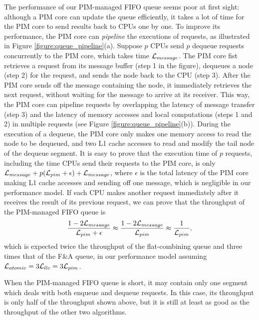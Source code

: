 The performance of our PIM-managed FIFO queue seems poor at first sight: although a PIM core can update 
the queue efficiently, it takes a lot of time for the PIM core to send results back to CPUs one by one. 
To improve its performance, the PIM core can \textit{pipeline} the executions of requests, 
as illustrated in Figure \ref{figure:queue_pipeline}(a). 
Suppose $p$ CPUs send $p$ dequeue requests concurrently to the PIM core, which takes time $\mathcal{L}_{message}$. 
The PIM core fist retrieves a request from its message buffer (step 1 in the figure), 
dequeues a node (step 2) for the request, and sends the node back to the CPU (step 3). 
After the PIM core sends off the message containing the node, it immediately retrieves the next 
request, without waiting for the message to arrive at its receiver. 
This way, the PIM core can pipeline requests by overlapping the latency of message transfer (step 3) 
and the latency of memory accesses and local computations (steps 1 and 2) in multiple requests 
(see Figure \ref{figure:queue_pipeline}(b)). 
During the execution of a dequeue, the PIM core only makes one memory access to read the node 
to be dequeued, and two L1 cache accesses to read and modify the tail node of the dequeue segment.  
It is easy to prove that the execution time of $p$ requests, including the time CPUs send 
their requests to the PIM core, is only $\mathcal{L}_{message} + p(\mathcal{L}_{pim} + \epsilon) + \mathcal{L}_{message}$, where $\epsilon$ 
is the total latency of the PIM core making L1 cache accesses and sending off one message, 
which is negligible in our performance model. 
If each CPU makes another request immediately after it receives the result of its previous request, 
we can prove that the throughput of the PIM-managed FIFO queue is 
$${1 - 2\mathcal{L}_{message} \over \mathcal{L}_{pim} + \epsilon} \approx {1 - 2\mathcal{L}_{message}\over \mathcal{L}_{pim}} 
\approx {1 \over \mathcal{L}_{pim}},$$
which is expected twice the throughput of the flat-combining queue and 
three times that of the F\&A queue, in our performance model 
assuming $\mathcal{L}_{atomic} = 3\mathcal{L}_{llc} = 3\mathcal{L}_{pim}$. 

When the PIM-managed FIFO queue is short, it may contain only one segment 
which deals with both enqueue and dequeue requests. 
In this case, its throughput is only half of the throughput shown above, 
but it is still at least as good as the throughput of the other two algorithms. 

